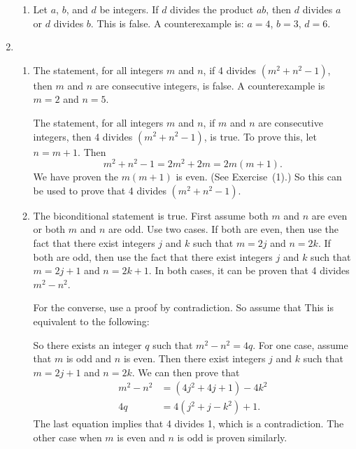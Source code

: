 \begin{enumerate}
\begin{enumerate}
\item Let $a$, $b$, and $d$ be integers.  If $d$ divides the product $ab$, then $d$ divides $a$ or $d$ divides $b$.  This is false.  A counterexample is:  $a = 4$, $b = 3$, $d = 6$.
\end{enumerate}


\item \begin{enumerate}
\item The statement, for all integers $m$ and $n$, if 4 divides $\left(m^2 + n^2 - 1 \right)$, then $m$ and $n$ are consecutive integers, is false.  A counterexample is $m = 2$ and $n = 5$.

The statement, for all integers $m$ and $n$, if $m$ and $n$ are consecutive integers, then 4 divides $\left(m^2 + n^2 - 1 \right)$, is true.  To prove this, let $n = m + 1$.  Then
\[
m^2 + n^2 - 1 = 2m^2 + 2m = 2m(m + 1).
\]
We have proven the $m(m + 1)$ is even.  (See Exercise~(1).)  So this can be used to prove that 4 divides $\left(m^2 + n^2 - 1 \right)$.

\item The biconditional statement is true. First assume both $m$ and $n$ are even or both $m$ and $n$ are odd. Use two cases.  If both are even, then use the fact that there exist integers 
$j$ and $k$ such that $m = 2j$ and $n = 2k$.  If both are odd, then use the fact that there exist integers $j$ and $k$ such that $m = 2j + 1$ and $n = 2k + 1$.  In both cases, it can be proven that 4 divides $m^2 - n^2$.

For the converse, use a proof by contradiction.  So assume that  This is equivalent to the following:
So there exists an integer $q$ such that $m^2 - n^2 = 4q$.  For one case, assume that $m$ is odd and $n$ is even.  Then there exist integers $j$ and $k$ such that $m = 2j + 1$ and $n = 2k$.  We can then prove that
\begin{align*}
m^2 - n^2 &= \left(4j^2 + 4j + 1 \right) - 4k^2 \\
       4q &=4 \left( j^2 + j - k^2 \right) + 1.
\end{align*}
The last equation implies that 4 divides 1, which is a contradiction.  The other case when $m$ is even and $n$ is odd is proven similarly.
\end{enumerate}



\end{enumerate}
